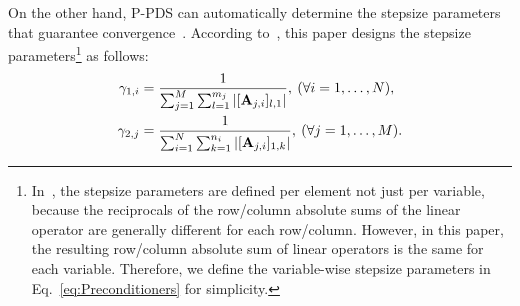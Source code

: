 \documentclass[10pt,journal]{IEEEtran}
\DeclareMathOperator{\diag}{diag}
\begin{document}
On the other hand, P-PDS can automatically determine the stepsize parameters that guarantee convergence~\cite{Pock2011PPDS,Naganuma2023PPDS}.
According to~\cite{Pock2011PPDS}, this paper designs the stepsize parameters\footnote{In~\cite{Pock2011PPDS}, the stepsize parameters are defined per element not just per variable, because the reciprocals of the row/column absolute sums of the linear operator are generally different for each row/column. However, in this paper, the resulting row/column absolute sum of linear operators is the same for each variable. Therefore, we define the variable-wise stepsize parameters in Eq.~\eqref{eq:Preconditioners} for simplicity.} as follows:
\begin{align}
    \label{eq:Preconditioners}
    \ScalarStepsize{1, \IndexPrimal} & = \frac{1}{\sum_{\IndexDual = 1}^{\NumVarDual} \sum_{\IndexVarDual = 1}^{\DimVarDual{\IndexDual}} | \MatrixBrackets[\LinOpPPDS{\IndexDual, \IndexPrimal}]{\IndexVarDual, 1} |} , \: (\forall \IndexPrimal = 1, \ldots, \NumVarPrimal), \notag \\
    \ScalarStepsize{2, \IndexDual} & = \frac{1}{\sum_{\IndexPrimal = 1}^{\NumVarPrimal} \sum_{\IndexVarPrimal = 1}^{\DimVarPrimal{\IndexPrimal}} | \MatrixBrackets[\LinOpPPDS{\IndexDual, \IndexPrimal}]{1, \IndexVarPrimal} |}, \: (\forall \IndexDual = 1, \ldots, \NumVarDual).
\end{align}
\end{document}
